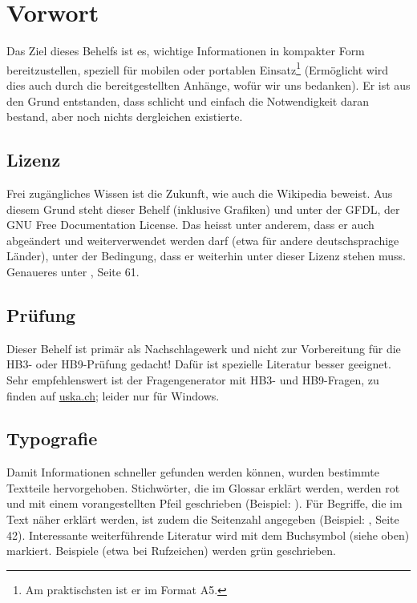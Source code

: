 \chapter{Vorwort}
Das Ziel dieses Behelfs ist es, wichtige Informationen in kompakter Form bereitzustellen, speziell für mobilen oder portablen Einsatz\footnote{Am praktischsten ist er im Format A5.} (Ermöglicht wird dies auch durch die bereitgestellten Anhänge, wofür wir uns bedanken). Er ist aus den Grund entstanden, dass schlicht und einfach die Notwendigkeit daran bestand, aber noch nichts dergleichen existierte.

\section{Lizenz}
Frei zugängliches Wissen ist die Zukunft, wie auch die Wikipedia beweist. Aus diesem Grund steht dieser Behelf (inklusive Grafiken) und unter der GFDL, der GNU Free Documentation License. Das heisst unter anderem, dass er auch abgeändert und weiterverwendet werden darf (etwa für andere deutschsprachige Länder), unter der Bedingung, dass er weiterhin unter dieser Lizenz stehen muss. Genaueres unter , Seite 61.

\section{Prüfung}

Dieser Behelf ist primär als Nachschlagewerk und nicht zur Vorbereitung für die HB3- oder HB9-Prüfung gedacht! Dafür ist spezielle Literatur besser geeignet. Sehr empfehlenswert ist der Fragengenerator mit HB3- und HB9-Fragen, zu finden auf \href{http://www.uska.ch}{uska.ch}; leider nur für Windows.

\section{Typografie}

Damit Informationen schneller gefunden werden können, wurden bestimmte Textteile hervorgehoben. Stichwörter, die im Glossar erklärt werden, werden rot und mit einem vorangestellten Pfeil geschrieben (Beispiel: ). Für Begriffe, die im Text näher erklärt werden, ist zudem die Seitenzahl angegeben (Beispiel: , Seite 42). Interessante weiterführende Literatur wird mit dem Buchsymbol (siehe oben) markiert. Beispiele (etwa bei Rufzeichen) werden grün geschrieben.

